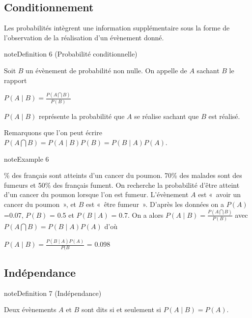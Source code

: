 \documentclass[letterpaper,10pt,french]{sphinxmanual}
\begin{document}
\subsection{Conditionnement}
\label{\detokenize{Rappels:conditionnement}}
\sphinxAtStartPar
Les probabilités  intègrent une information supplémentaire sous la forme de l’observation de la réalisation d’un évènement donné.

\ignorespaces \label{Rappels:definition-11}
\begin{sphinxadmonition}{note}{Definition 6 (Probabilité conditionnelle)}



\sphinxAtStartPar
Soit \(B\) un évènement de probabilité non nulle. On appelle  de \(A\) sachant \(B\) le rapport

\sphinxAtStartPar
\(P(A\mid B) = \frac{P(A\bigcap B)}{P(B)}\)
\end{sphinxadmonition}

\sphinxAtStartPar
\(P(A\mid B)\) représente la probabilité que \(A\) se réalise sachant que \(B\) est réalisé.

\sphinxAtStartPar
Remarquons que l’on peut écrire \(P(A\bigcap B) = P(A\mid B)P(B) = P(B\mid A)P(A)\).
\label{Rappels:example-12}
\begin{sphinxadmonition}{note}{Example 6}



\% des français sont atteints d’un cancer du poumon. 70\% des malades sont des fumeurs et 50\% des français fument. On recherche la probabilité d’être atteint d’un cancer du poumon lorsque l’on est fumeur.
L’évènement \(A\) est « avoir un cancer du poumon », et \(B\) est « être fumeur ». D’après les données on a \(P(A)\)=0.07, \(P(B)\) = 0.5 et \(P(B\mid A)\) = 0.7.
On a alors \(P(A\mid B) = \frac{P(A\bigcap B)}{P(B)}\) avec \(P(A\bigcap B)=P(B\mid A)P(A)\) d’où

\sphinxAtStartPar
\(P(A\mid B)=\frac{P(B\mid A)P(A)}{P(B}\) = 0.098
\end{sphinxadmonition}


\subsection{Indépendance}
\label{\detokenize{Rappels:independance}}
\ignorespaces \label{Rappels:definition-13}
\begin{sphinxadmonition}{note}{Definition 7 (Indépendance)}



\sphinxAtStartPar
Deux évènements \(A\) et \(B\) sont dits  si et seulement si \(P(A\mid B) = P(A)\).
\end{sphinxadmonition}
\end{document}
